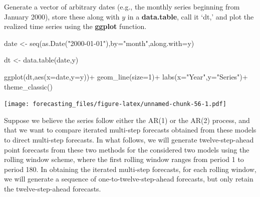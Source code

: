 \documentclass[
  12pt,
  oneside]{book}
\newenvironment{Shaded}{\begin{snugshade}}{\end{snugshade}}
\newcommand{\AttributeTok}[1]{\textcolor[rgb]{0.77,0.63,0.00}{#1}}
\newcommand{\DecValTok}[1]{\textcolor[rgb]{0.00,0.00,0.81}{#1}}
\newcommand{\FunctionTok}[1]{\textcolor[rgb]{0.00,0.00,0.00}{#1}}
\newcommand{\NormalTok}[1]{#1}
\newcommand{\OtherTok}[1]{\textcolor[rgb]{0.56,0.35,0.01}{#1}}
\newcommand{\SpecialCharTok}[1]{\textcolor[rgb]{0.00,0.00,0.00}{#1}}
\newcommand{\StringTok}[1]{\textcolor[rgb]{0.31,0.60,0.02}{#1}}
\begin{document}
Generate a vector of arbitrary dates (e.g., the monthly series beginning from January 2000), store these along with \(y\) in a \textbf{data.table}, call it `dt,' and plot the realized time series using the \textbf{ggplot} function.

\begin{Shaded}
\begin{Highlighting}[]
\NormalTok{date }\OtherTok{\textless{}{-}} \FunctionTok{seq}\NormalTok{(}\FunctionTok{as.Date}\NormalTok{(}\StringTok{"2000{-}01{-}01"}\NormalTok{),}\AttributeTok{by=}\StringTok{"month"}\NormalTok{,}\AttributeTok{along.with=}\NormalTok{y)}

\NormalTok{dt }\OtherTok{\textless{}{-}} \FunctionTok{data.table}\NormalTok{(date,y)}

\FunctionTok{ggplot}\NormalTok{(dt,}\FunctionTok{aes}\NormalTok{(}\AttributeTok{x=}\NormalTok{date,}\AttributeTok{y=}\NormalTok{y))}\SpecialCharTok{+}
  \FunctionTok{geom\_line}\NormalTok{(}\AttributeTok{size=}\DecValTok{1}\NormalTok{)}\SpecialCharTok{+}
  \FunctionTok{labs}\NormalTok{(}\AttributeTok{x=}\StringTok{"Year"}\NormalTok{,}\AttributeTok{y=}\StringTok{"Series"}\NormalTok{)}\SpecialCharTok{+}
  \FunctionTok{theme\_classic}\NormalTok{()}
\end{Highlighting}
\end{Shaded}

\texttt{[image: forecasting\_files/figure-latex/unnamed-chunk-56-1.pdf]}

Suppose we believe the series follow either the AR(1) or the AR(2) process, and that we want to compare iterated multi-step forecasts obtained from these models to direct multi-step forecasts. In what follows, we will generate twelve-step-ahead point forecasts from these two methods for the considered two models using the rolling window scheme, where the first rolling window ranges from period 1 to period 180. In obtaining the iterated multi-step forecasts, for each rolling window, we will generate a sequence of one-to-twelve-step-ahead forecasts, but only retain the twelve-step-ahead forecasts.
\end{document}
